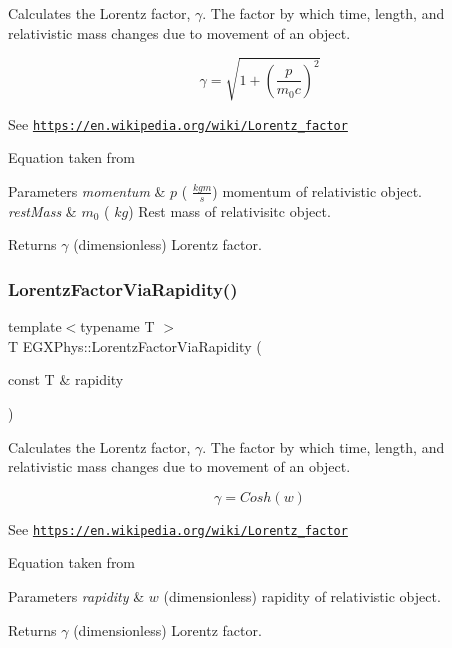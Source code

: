 Calculates the Lorentz factor, $\gamma$. The factor by which time, length, and relativistic mass changes due to movement of an object. 

\[\gamma=\sqrt{1+(\frac{p}{m_0 c})^2}\]

See \href{https://en.wikipedia.org/wiki/Lorentz_factor}{\tt https\+://en.\+wikipedia.\+org/wiki/\+Lorentz\+\_\+factor}

Equation taken from


\begin{DoxyParams}{Parameters}
{\em momentum} & $p$ ( $\frac{kg m}{s}$) momentum of relativistic object. \\
\hline
{\em rest\+Mass} & $m_0$ ( $kg$) Rest mass of relativisitc object. \\
\hline
\end{DoxyParams}
\begin{DoxyReturn}{Returns}
$\gamma$ (dimensionless) Lorentz factor. 
\end{DoxyReturn}
\mbox{\label{group___relativity_ga8064f5bce1d2ca5f7bc39d95ba4d2dd9}} 
\subsubsection{\texorpdfstring{Lorentz\+Factor\+Via\+Rapidity()}{LorentzFactorViaRapidity()}}
{\footnotesize\ttfamily template$<$typename T $>$ \\
T E\+G\+X\+Phys\+::\+Lorentz\+Factor\+Via\+Rapidity (\begin{DoxyParamCaption}\item[{const T \&}]{rapidity }\end{DoxyParamCaption})}



Calculates the Lorentz factor, $\gamma$. The factor by which time, length, and relativistic mass changes due to movement of an object. 

\[\gamma=Cosh(w)\]

See \href{https://en.wikipedia.org/wiki/Lorentz_factor}{\tt https\+://en.\+wikipedia.\+org/wiki/\+Lorentz\+\_\+factor}

Equation taken from


\begin{DoxyParams}{Parameters}
{\em rapidity} & $w$ (dimensionless) rapidity of relativistic object. \\
\hline
\end{DoxyParams}
\begin{DoxyReturn}{Returns}
$\gamma$ (dimensionless) Lorentz factor. 
\end{DoxyReturn}
